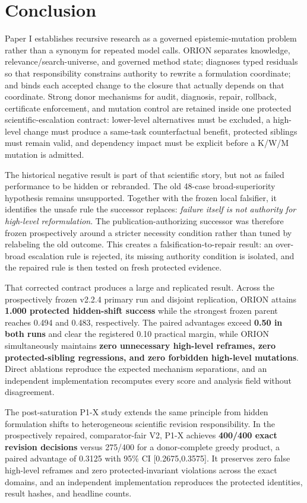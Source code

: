 \section{Conclusion}

Paper I establishes recursive research as a governed epistemic-mutation problem rather than a synonym for repeated model calls. ORION separates knowledge, relevance/search-universe, and governed method state; diagnoses typed residuals so that responsibility constrains authority to rewrite a formulation coordinate; and binds each accepted change to the closure that actually depends on that coordinate. Strong donor mechanisms for audit, diagnosis, repair, rollback, certificate enforcement, and mutation control are retained inside one protected scientific-escalation contract: lower-level alternatives must be excluded, a high-level change must produce a same-task counterfactual benefit, protected siblings must remain valid, and dependency impact must be explicit before a K/W/M mutation is admitted.

The historical negative result is part of that scientific story, but not as failed performance to be hidden or rebranded. The old 48-case broad-superiority hypothesis remains unsupported. Together with the frozen local falsifier, it identifies the unsafe rule the successor replaces: \emph{failure itself is not authority for high-level reformulation}. The publication-authorizing successor was therefore frozen prospectively around a stricter necessity condition rather than tuned by relabeling the old outcome. This creates a falsification-to-repair result: an over-broad escalation rule is rejected, its missing authority condition is isolated, and the repaired rule is then tested on fresh protected evidence.

That corrected contract produces a large and replicated result. Across the prospectively frozen v2.2.4 primary run and disjoint replication, ORION attains \textbf{1.000 protected hidden-shift success} while the strongest frozen parent reaches 0.494 and 0.483, respectively. The paired advantages exceed \textbf{0.50 in both runs} and clear the registered 0.10 practical margin, while ORION simultaneously maintains \textbf{zero unnecessary high-level reframes, zero protected-sibling regressions, and zero forbidden high-level mutations}. Direct ablations reproduce the expected mechanism separations, and an independent implementation recomputes every score and analysis field without disagreement.

The post-saturation P1-X study extends the same principle from hidden formulation shifts to heterogeneous scientific revision responsibility. In the prospectively repaired, comparator-fair V2, P1-X achieves \textbf{400/400 exact revision decisions} versus 275/400 for a donor-complete greedy product, a paired advantage of 0.3125 with 95\% CI [0.2675,0.3575]. It preserves zero false high-level reframes and zero protected-invariant violations across the exact domains, and an independent implementation reproduces the protected identities, result hashes, and headline counts.

